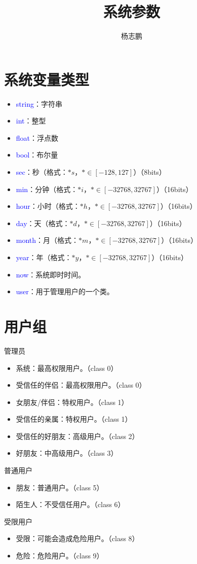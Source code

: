 \documentclass[UTF8]{ctexart}
\title{系统参数}
\author{杨志鹏}
\begin{document}
\maketitle
\pagestyle{fancy}
\tableofcontents{}
\section{系统变量类型}
\begin{itemize}
\item \textcolor{blue}{string}：字符串
\item \textcolor{blue}{int}：整型
\item \textcolor{blue}{float}：浮点数
\item \textcolor{blue}{bool}：布尔量
\item \textcolor{blue}{sec}：秒（格式：$*s$，$*\in[-128,127]$）（8bits）
\item \textcolor{blue}{min}：分钟（格式：$*i$，$*\in[-32768,32767]$）（16bits）
\item \textcolor{blue}{hour}：小时（格式：$*h$，$*\in[-32768,32767]$）（16bits）
\item \textcolor{blue}{day}：天（格式：$*d$，$*\in[-32768,32767]$）（16bits）
\item \textcolor{blue}{month}：月（格式：$*m$，$*\in[-32768,32767]$）（16bits）
\item \textcolor{blue}{year}：年（格式：$*y$，$*\in[-32768,32767]$）（16bits）
\item \textcolor{blue}{now}：系统即时时间。
\item \textcolor{blue}{user}：用于管理用户的一个类。
\end{itemize}
\section{用户组}
\noindent
管理员
\begin{itemize}
\item 系统：最高权限用户。（\textcolor[rgb]{0.9,0.6,0}{class 0}）
\item 受信任的伴侣：最高权限用户。（\textcolor[rgb]{0.9,0.6,0}{class 0}）
\item 女朋友/伴侣：特权用户。（\textcolor[rgb]{0.9,0.6,0}{class 1}）
\item 受信任的亲属：特权用户。（\textcolor[rgb]{0.9,0.6,0}{class 1}）
\item 受信任的好朋友：高级用户。（\textcolor[rgb]{0.9,0.6,0}{class 2}）
\item 好朋友：中高级用户。（\textcolor[rgb]{0.9,0.6,0}{class 3}）
\end{itemize}
普通用户
\begin{itemize}
\item 朋友：普通用户。（\textcolor[rgb]{0.9,0.6,0}{class 5}）
\item 陌生人：不受信任用户。（\textcolor[rgb]{0.9,0.6,0}{class 6}）
\end{itemize}
受限用户
\begin{itemize}
\item 受限：可能会造成危险用户。（\textcolor[rgb]{0.9,0.6,0}{class 8}）
\item 危险：危险用户。（\textcolor[rgb]{0.9,0.6,0}{class 9}）
\end{itemize}
\end{document}
